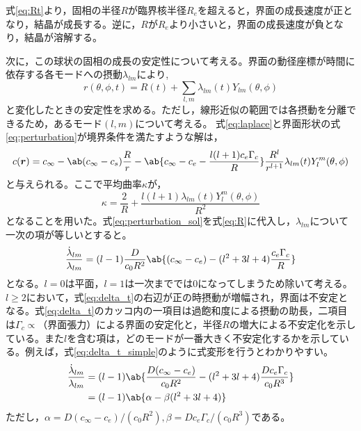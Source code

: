 \documentclass[autodetect-engine,dvi=dvipdfmx,a4paper,ja=standard,oneside,openany]{bxjsbook}
\begin{document}
式\eqref{eq:Rt}より，固相の半径$R$が臨界核半径$R_e$を超えると，界面の成長速度が正となり，結晶が成長する。逆に，$R$が$R_e$より小さいと，界面の成長速度が負となり，結晶が溶解する。

次に，この球状の固相の成長の安定性について考える。界面の動径座標が時間に依存する各モードへの摂動$\lambda_{lm}$により,
\begin{equation}
  r(\theta,\phi,t) = R(t) + \sum_{l,m} \lambda_{lm}(t)Y_{lm}(\theta,\phi)
  \label{eq:perturbation}
\end{equation}
と変化したときの安定性を求める。ただし，線形近似の範囲では各摂動を分離できるため，あるモード$(l,m)$について考える。
式\eqref{eq:laplace}と界面形状の式\eqref{eq:perturbation}が境界条件を満たすような解は，
\begin{equation}
  \begin{split}
    c(\bm{r})=c_{\infty}-\ab(c_{\infty}-c_s)\frac{R}{r}-\ab\{c_\infty-c_e-\frac{l(l+1)c_e\Gamma_c}{R}\}\frac{R^l}{r^{l+1}}\lambda_{lm}(t)Y_{l}^{m}(\theta,\phi)
  \end{split}
  \label{eq:perturbation_sol}
\end{equation}
と与えられる。ここで平均曲率$\kappa$が，
\begin{equation}
  \kappa = \frac{2}{R}+\frac{l(l+1)\lambda_{lm}(t)Y_l^m(\theta,\phi)}{R^2}
  \label{eq:perturbation_curvature}
\end{equation}
となることを用いた。式\eqref{eq:perturbation_sol}を式\eqref{eq:R}に代入し，$\lambda_{lm}$について一次の項が等しいとすると。
\begin{equation}
  \frac{\dot{\lambda}_{lm}}{\lambda_{lm}} =(l-1)\frac{D}{c_0R^2}\ab\{(c_\infty-c_e)-(l^2+3l+4)\frac{c_e\Gamma_c}{R}\}
  \label{eq:delta_t}
\end{equation}
となる。$l=0$は平面，$l=1$は一次まででは0になってしまうため除いて考える。$l\geq2$において，式\eqref{eq:delta_t}の右辺が正の時摂動が増幅され，界面は不安定となる。式\eqref{eq:delta_t}のカッコ内の一項目は過飽和度による摂動の助長，二項目は$\Gamma_c\propto$（界面張力）による界面の安定化と，半径$R$の増大による不安定化を示している。また$l$を含む項は，どのモードが一番大きく不安定化するかを示している。例えば，式\eqref{eq:delta_t_simple}のように式変形を行うとわかりやすい。
\begin{equation}
  \begin{split}
    \frac{\dot{\lambda}_{lm}}{\lambda_{lm}} & =(l-1)\ab\{\frac{D(c_\infty-c_e)}{c_0R^2}-(l^2+3l+4)\frac{D c_e\Gamma_c}{c_0 R^3}\} \\
                                            & =(l-1)\ab\{\alpha-\beta(l^2+3l+4)\}
  \end{split}
  \label{eq:delta_t_simple}
\end{equation}
ただし，$\alpha=D(c_\infty-c_e)/(c_0R^2),\beta=D c_e\Gamma_c/(c_0 R^3)$である。
\end{document}
